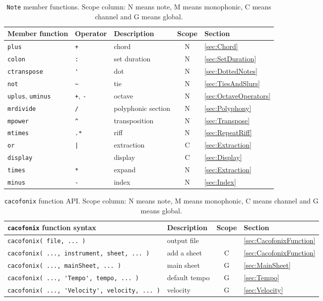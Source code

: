 \documentclass{article}
\begin{document}
\begin{table}[p]
	\centering
	\begin{tabular}{lllcl}
		Member function & Operator & Description & Scope & Section \\
		\hline
		\lstinline!plus! & \lstinline!+! & chord & N & \ref{sec:Chord} \\
		\lstinline!colon! & \lstinline!:! & set duration & N & \ref{sec:SetDuration} \\
		\lstinline!ctranspose! & \lstinline!'! & dot & N & \ref{sec:DottedNotes} \\
		\lstinline!not! & \lstinline!~! & tie & N & \ref{sec:TiesAndSlurs} \\
		\lstinline!uplus!, \lstinline!uminus! & \lstinline!+!, \lstinline!-! & octave & N & \ref{sec:OctaveOperators} \\
		\lstinline!mrdivide! & \lstinline!/! & polyphonic section & N & \ref{sec:Polyphony} \\
		\lstinline!mpower! & \lstinline!^! & transposition & N & \ref{sec:Transpose} \\
		\lstinline!mtimes! & \lstinline!.*! & riff & N & \ref{sec:RepeatRiff} \\
		\lstinline!or! & \lstinline!|! & extraction & C & \ref{sec:Extraction} \\
		\lstinline!display!& & display & C & \ref{sec:Display} \\
		\lstinline!times! & \lstinline!*! & expand & N & \ref{sec:Extraction} \\
		\lstinline!minus! & \lstinline!-! & index & N & \ref{sec:Index} \\
	\end{tabular}
	\caption[\lstinline!Note! member functions]{\lstinline!Note! member functions. Scope column: N means note, M means monophonic, C means channel and G means global.}
	\label{tab:NoteFunctions}
\end{table}

\begin{table}[p]
	\centering
	\begin{tabular}{llcl}
		\lstinline!cacofonix! function syntax & Description & Scope & Section \\
		\hline
		\lstinline!cacofonix( file, ... )! & output file & & \ref{sec:CacofonixFunction} \\
		\lstinline!cacofonix( ..., instrument, sheet, ... )! & add a sheet & C & \ref{sec:CacofonixFunction} \\
		\lstinline!cacofonix( ..., mainSheet, ... )! & main sheet & G & \ref{sec:MainSheet} \\
		\lstinline!cacofonix( ..., 'Tempo', tempo, ... )! & default tempo & G & \ref{sec:Tempo} \\
		\lstinline!cacofonix( ..., 'Velocity', velocity, ... )! & velocity & G & \ref{sec:Velocity} \\
	\end{tabular}
	\caption[\lstinline!cacofonix! function API]{\lstinline!cacofonix! function API. Scope column: N means note, M means monophonic, C means channel and G means global.}
	\label{tab:CacofonixAPI}
\end{table}
\end{document}
